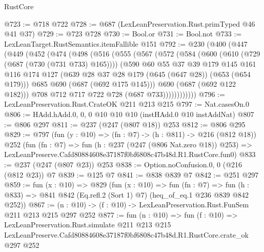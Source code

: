 \begin{lexlean}{RustCore}
\begin{coremodule}
@723 := @718 @722
@728 := @687 (LexLeanPreservation.Rust.primTyped @46 @41 @37)
@729 := @723 @728
@730 := Bool.or
@731 := Bool.not
@733 := LexLeanTarget.RustSemantics.itemFallible @151
@792 := @230
    (@400
      (@447
        (@449
          (@452
            (@474
              (@498
                (@516
                  (@555
                    (@567
                      (@572
                        (@584
                          (@600
                            (@610 (@729 (@687 (@730 (@731 @733) @165))))
                            (@590
                              @60
                              @55
                              @37
                              @39
                              @179
                              @145
                              @161
                              @116
                              @174
                              @127
                              (@639 @28 @37 @28 @179 (@645 (@647 @28)) (@653 (@654 @179)))
                              @685
                              @690
                              (@687 (@692 @175 @145)))
                            @690
                            (@687 (@692 @122 @182)))
                          @708
                          @712
                          @717
                          @722
                          @728
                          (@687 @733))))))))))))
@796 := LexLeanPreservation.Rust.CrateOK @211 @213 @215
@797 := Nat.casesOn.{0}
@806 := HAdd.hAdd.{0, 0, 0} @10 @10 @10 (instHAdd.{0} @10 instAddNat)
@807 := @806 @297
@811 := @237 (@247 (@807 @18)) @253
@812 := @806 @295
@829 := @797
    (fun (y : @10) => (fn : @7) -> (h : @811) -> @216 (@812 @18))
    @252
    (fun (fn : @7) =>
    fun (h : @237 (@247 (@806 Nat.zero @18)) @253) =>
    LexLeanPreserve.Cafd80884608e37187f0bf6808c47b48d.R1.RustCore.fun0)
@833 := @237 (@247 (@807 @23)) @253
@838 := Option.noConfusion.{0, 0} (@216 (@812 @23)) @7
@839 := @125 @7
@841 := @838 @839 @7
@842 := @251 @297
@859 := fun (x : @10) =>
  @829
    (fun (x : @10) =>
    fun (fn : @7) =>
    fun (h : @833) => @841 @842 (Eq.refl.{2} (Sort 1) @7) (heq_of_eq.{1} @236 @839 @842 @252))
@867 := (n : @10) -> (f : @10) -> LexLeanPreservation.Rust.FunSem @211 @213 @215 @297 @252
@877 := fun (n : @10) =>
  fun (f : @10) =>
  LexLeanPreservation.Rust.simulate
    @211
    @213
    @215
    LexLeanPreserve.Cafd80884608e37187f0bf6808c47b48d.R1.RustCore.crate_ok
    @297
    @252
\end{coremodule}
\end{lexlean}
